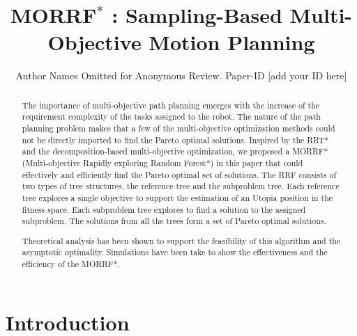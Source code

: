 \documentclass[conference]{IEEEtran}
\theoremstyle{definition}
\begin{document}
\title{ MORRF$^{*}$ : Sampling-Based Multi-Objective Motion Planning }

\author{Author Names Omitted for Anonymous Review. Paper-ID [add your ID here]}

\maketitle

\begin{abstract}
The importance of multi-objective path planning emerges with the increase of the requirement complexity of the tasks assigned to the robot.
The nature of the path planning problem makes that a few of the multi-objective optimization methods could not be directly imported to find the Pareto optimal solutions.
Inspired by the RRT* and the decomposition-based multi-objective optimization, we proposed a MORRF*(Multi-objective Rapidly exploring Random Forest*) in this paper that could effectively and efficiently find the Pareto optimal set of solutions.
The RRF consists of two types of tree structures, the reference tree and the subproblem tree.
Each reference tree explores a single objective to support the estimation of an Utopia position in the fitness space.
Each subproblem tree explores to find a solution to the assigned subproblem.
The solutions from all the trees form a set of Pareto optimal solutions. 

Theoretical analysis has been shown to support the feasibility of this algorithm and the asymptotic optimality. 
Simulations have been take to show the effectiveness and the efficiency of the MORRF*.
\end{abstract}

\IEEEpeerreviewmaketitle

\section{Introduction}
\label{sec:intro}
\end{document}
